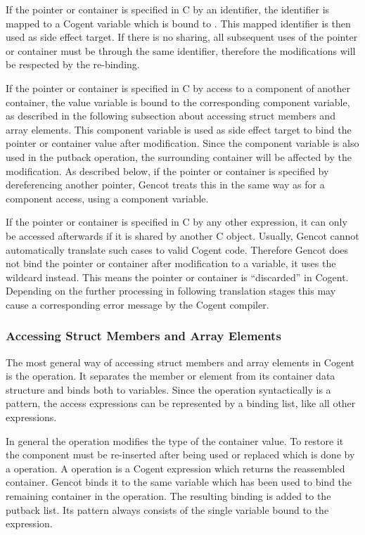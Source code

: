 If the pointer or container is specified in C by an identifier, the identifier is mapped to a Cogent variable 
which is bound to . This mapped identifier is then used as side effect target. If there is no sharing, all 
subsequent uses of the pointer or container must be through the same identifier, therefore the modifications will be
respected by the re-binding.

If the pointer or container is specified in C by access to a component of another container, the value variable 
 is bound to the corresponding component variable, as described in the following subsection about 
accessing struct members and array elements. This component variable is used as side effect target to bind the pointer
or container value after modification. Since the component variable is also used in the putback operation, the surrounding
container will be affected by the modification. As described below, if the pointer or container is specified by dereferencing
another pointer, Gencot treats this in the same way as for a component access, using a component variable.

If the pointer or container is specified in C by any other expression, it can only be accessed afterwards if it is shared 
by another C object. Usually, Gencot cannot automatically translate such cases to valid Cogent code. Therefore Gencot 
does not bind the pointer or container after modification to a variable, it uses the wildcard \code{\_} instead. This
means the pointer or container is ``discarded'' in Cogent. Depending on the further processing in following translation 
stages this may cause a corresponding error message by the Cogent compiler.

\subsubsection{Accessing Struct Members and Array Elements}

The most general way of accessing struct members and array elements in Cogent is the  operation. It separates
the member or element from its container data structure and binds both to variables. Since the  operation 
syntactically is a pattern, the access expressions can be represented by a binding list, like all other expressions.

In general the  operation modifies the type of the container value. To restore it the component must 
be re-inserted after being used or replaced which is done by a  operation. A  operation is a Cogent
expression which returns the reassembled container. Gencot binds it to the same variable which has been used 
to bind the remaining container in the  operation. The resulting binding is added to the putback list.
Its pattern always consists of the single variable bound to the  expression.

